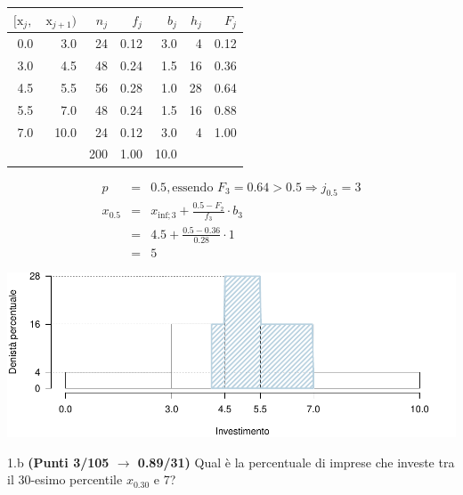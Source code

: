 \documentclass[
  11pt,
]{book}
\theoremstyle{mytheoremstyle}
\theoremstyle{mydefstyle}
\newenvironment{sol}
  {
  \begin{tcolorbox}[enhanced,breakable,arc=0.1mm,boxrule=1pt,colback=white,colframe=iblue,
  title=\bf \fontfamily{lmss}\selectfont \hspace{.5 cm} Soluzione,drop fuzzy shadow]

}{
\end{tcolorbox}
  }
\begin{document}
\begin{sol}

\begin{table}[H]
\centering
\begin{tabular}{rrrrrrr}
\toprule
$[\text{x}_j,$ & $\text{x}_{j+1})$ & $n_j$ & $f_j$ & $b_j$ & $h_j$ & $F_j$\\
\midrule
0.0 & 3.0 & 24 & 0.12 & 3.0 & 4 & 0.12\\
3.0 & 4.5 & 48 & 0.24 & 1.5 & 16 & 0.36\\
4.5 & 5.5 & 56 & 0.28 & 1.0 & 28 & 0.64\\
5.5 & 7.0 & 48 & 0.24 & 1.5 & 16 & 0.88\\
7.0 & 10.0 & 24 & 0.12 & 3.0 & 4 & 1.00\\
 &  & 200 & 1.00 & 10.0 &  & \\
\bottomrule
\end{tabular}
\end{table}

\begin{eqnarray*}
  p &=&  0.5 , \text{essendo }F_{ 3 }= 0.64  > 0.5  \Rightarrow j_{ 0.5 }= 3 \\
  x_{ 0.5 } &=& x_{\text{inf}; 3 } + \frac{ { 0.5 } - F_{ 2 }} {f_{ 3 }} \cdot b_{ 3 } \\
            &=&  4.5  + \frac {{ 0.5 } -  0.36 } { 0.28 } \cdot  1  \\
            &=&  5 
\end{eqnarray*}

\begin{center}\includegraphics{Esami_passati_con_soluzioni_files/figure-latex/2024-125-1} \end{center}

\end{sol}

1.b \textbf{(Punti 3/105 \(\rightarrow\) 0.89/31)} Qual è la percentuale di imprese che investe tra il 30-esimo percentile \(x_{0.30}\) e 7?
\end{document}
